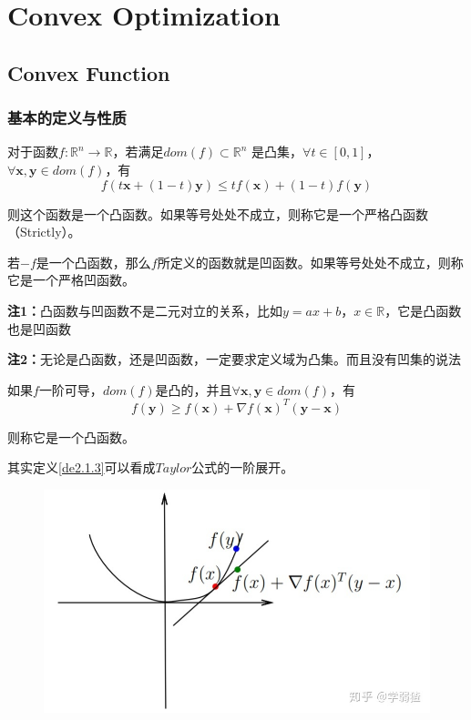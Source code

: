\documentclass[lang=cn,10pt]{elegantbook}
\newcommand\bv[1]{\boldsymbol{#1}}
\newcommand\mb[1]{\mathbb{#1}}
\begin{document}
\chapter{Convex Optimization}
\section{Convex Function}
\subsection*{基本的定义与性质}
\begin{definition}
	对于函数${f}:\mathbb{R}^n \to \mathbb{R}$，若满足$dom( {f}) \subset \mb{R}^n$
	是凸集，$\forall t \in [0,1]$，$\forall \bv{x,y} \in dom( {f})$，有
	\begin{equation}
		f(t\bv{x}+(1-t)\bv{y})\leq tf(\bv{x})+(1-t)f(\bv{y})
	\end{equation}

	则这个函数是一个凸函数。如果等号处处不成立，则称它是一个严格凸函数（Strictly）。
\end{definition}
\begin{definition}
	若$-f$是一个凸函数，那么$f$所定义的函数就是凹函数。如果等号处处不成立，则称它是一个严格凹函数。
\end{definition}

\textbf{注1：}凸函数与凹函数不是二元对立的关系，比如$y=ax+b，x \in \mb{R}$，它是凸函数也是凹函数

\textbf{注2：}无论是凸函数，还是凹函数，一定要求定义域为凸集。而且没有凹集的说法

\begin{definition}
	\label{de2.1.3}
	如果$f$一阶可导，$dom(f)$是凸的，并且$\forall \bv{x,y} \in dom(f)$，有
	\begin{equation}\label{eq2.2}
		f(\bv{y}) \geq f(\bv{x}) + \nabla f(\bv{x})^T (\bv{y-x})
	\end{equation}

	则称它是一个凸函数。
\end{definition}

其实定义\ref{de2.1.3}可以看成$Taylor$公式的一阶展开。

\begin{figure}[h]
	\centering
	\includegraphics[scale = 0.5]{img/cf3.jpg}
	\caption{}
	\label{cf3}
\end{figure}
\end{document}
